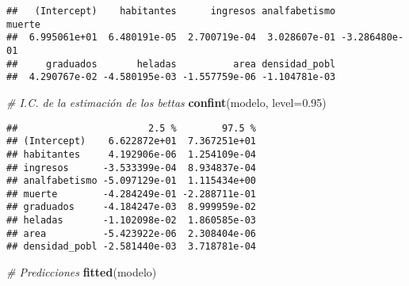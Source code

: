 \documentclass[]{article}
\newenvironment{Shaded}{\begin{snugshade}}{\end{snugshade}}
\newcommand{\KeywordTok}[1]{\textcolor[rgb]{0.13,0.29,0.53}{\textbf{#1}}}
\newcommand{\DataTypeTok}[1]{\textcolor[rgb]{0.13,0.29,0.53}{#1}}
\newcommand{\FloatTok}[1]{\textcolor[rgb]{0.00,0.00,0.81}{#1}}
\newcommand{\CommentTok}[1]{\textcolor[rgb]{0.56,0.35,0.01}{\textit{#1}}}
\newcommand{\NormalTok}[1]{#1}
\begin{document}
\begin{verbatim}
##   (Intercept)    habitantes      ingresos analfabetismo        muerte 
##  6.995061e+01  6.480191e-05  2.700719e-04  3.028607e-01 -3.286480e-01 
##     graduados       heladas          area densidad_pobl 
##  4.290767e-02 -4.580195e-03 -1.557759e-06 -1.104781e-03
\end{verbatim}

\begin{Shaded}
\begin{Highlighting}[]
\CommentTok{# I.C. de la estimación de los bettas}
\KeywordTok{confint}\NormalTok{(modelo, }\DataTypeTok{level=}\FloatTok{0.95}\NormalTok{) }
\end{Highlighting}
\end{Shaded}

\begin{verbatim}
##                       2.5 %        97.5 %
## (Intercept)    6.622872e+01  7.367251e+01
## habitantes     4.192906e-06  1.254109e-04
## ingresos      -3.533399e-04  8.934837e-04
## analfabetismo -5.097129e-01  1.115434e+00
## muerte        -4.284249e-01 -2.288711e-01
## graduados     -4.184247e-03  8.999959e-02
## heladas       -1.102098e-02  1.860585e-03
## area          -5.423922e-06  2.308404e-06
## densidad_pobl -2.581440e-03  3.718781e-04
\end{verbatim}

\begin{Shaded}
\begin{Highlighting}[]
\CommentTok{# Predicciones}
\KeywordTok{fitted}\NormalTok{(modelo) }
\end{Highlighting}
\end{Shaded}
\end{document}
